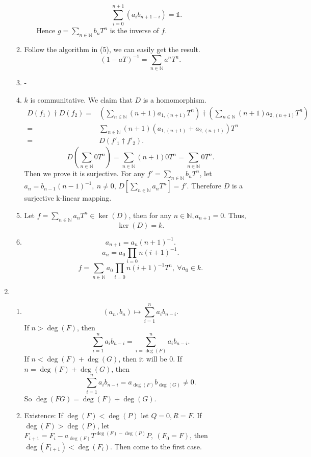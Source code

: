\documentclass[12pt]{article}
\newcommand{\NN}{\mathbb{N}}
\begin{document}
\begin{enumerate}
\begin{enumerate}
\begin{enumerate}
                        $$\sum_{i=0}^{n+1}(a_ib_{n+1-i})=\mathds{1}.$$
                        Hence $\displaystyle g=\sum_{n\in \NN}b_nT^n$ is the inverse of $f$.
                \end{enumerate}
                \item Follow the algorithm in (5), we can easily get the result.
                    $$(1-aT)^{-1}=\sum_{n\in \NN}a^nT^n.$$
                \item -
                \item $k$ is communitative. We claim that $D$ is a homomorphism. 
                    \begin{align*}
                        D(f_1)\dagger D(f_2)=&\left(\sum_{n\in \NN}(n+1)a_{1,(n+1)}T^n\right)\dagger \left(\sum_{n\in \NN}(n+1)a_{2,(n+1)}T^n\right)\\
                        =&\sum_{n\in \NN}(n+1)(a_{1,(n+1)}+ a_{2,(n+1)})T^n\\
                        =&D\left(f'_1\dagger f'_2\right).
                    \end{align*}
                    $$
                        D\left(\sum_{n\in\NN}0T^n\right)=\sum_{n\in \NN}(n+1)0T^n=\sum_{n\in \NN}0T^n.
                    $$
                    Then we prove it is surjective. For any $f'=\sum_{n\in \NN}b_nT^n$, let $a_n=b_{n-1}(n-1)^{-1},\ n\not=0$, $D[\sum_{n\in\NN}a_nT^n]=f'$. Therefore $D$ is a surjective k-linear mapping.
                \item Let $\displaystyle f=\sum_{n\in \NN}a_nT^n\in \ker(D)$, then for any $n\in\NN,a_{n+1}=0.$ Thus, 
                    $$\ker(D)=k.$$
                \item $$a_{n+1}=a_n(n+1)^{-1}.$$
                    $$a_n=a_0\prod_{i=0}{n}(i+1)^{-1}.$$
                    $$f=\sum_{n\in\NN}a_0\prod_{i=0}{n}(i+1)^{-1}T^n,\ \forall a_0\in k.$$
        \end{enumerate}
    \item 
        \begin{enumerate}
            \item $$(a_n,b_n)\longmapsto \sum_{i=1}^{n}a_ib_{n-i}.$$
                If $n>\deg(F)$, then 
                $$\sum_{i=1}^{n}a_ib_{n-i}=\sum_{i=\deg(F)}^{n}a_ib_{n-i}.$$
                If $n<\deg(F)+\deg(G)$, then it will be $0$.
                If $n=\deg(F)+\deg(G)$, then
                $$\sum_{i=1}^{n}a_ib_{n-i}=a_{\deg(F)}b_{\deg(G)}\not=0.$$
                So $\deg(FG)=\deg(F)+\deg(G).$
            \item   Existence: If $\deg(F)<\deg(P)$ let $Q=0,R=F$. If $\deg(F)>\deg(P)$, let $F_{i+1}=F_{i}-a_{\deg(F)}T^{\deg(F)-\deg(P)}P, \ (F_0=F)$, then $\deg(F_{i+1})<\deg(F_i).$ Then come to the first case. 

\end{enumerate}
\end{enumerate}
\end{document}
